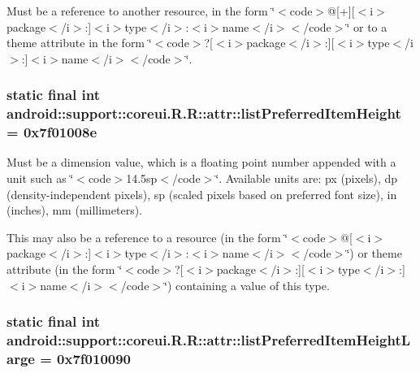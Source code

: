 Must be a reference to another resource, in the form \char`\"{}$<$code$>$@\mbox{[}+\mbox{]}\mbox{[}$<$i$>$package$<$/i$>$:\mbox{]}$<$i$>$type$<$/i$>$:$<$i$>$name$<$/i$>$$<$/code$>$\char`\"{} or to a theme attribute in the form \char`\"{}$<$code$>$?\mbox{[}$<$i$>$package$<$/i$>$:\mbox{]}\mbox{[}$<$i$>$type$<$/i$>$:\mbox{]}$<$i$>$name$<$/i$>$$<$/code$>$\char`\"{}. \hypertarget{classandroid_1_1support_1_1coreui_1_1_r_1_1attr_0d738afb53c0414840da274828da88df}{
\subsubsection[{listPreferredItemHeight}]{\setlength{\rightskip}{0pt plus 5cm}static final int android::support::coreui.R.R::attr::listPreferredItemHeight = 0x7f01008e}}
\label{classandroid_1_1support_1_1coreui_1_1_r_1_1attr_0d738afb53c0414840da274828da88df}


Must be a dimension value, which is a floating point number appended with a unit such as \char`\"{}$<$code$>$14.5sp$<$/code$>$\char`\"{}. Available units are: px (pixels), dp (density-independent pixels), sp (scaled pixels based on preferred font size), in (inches), mm (millimeters). 

This may also be a reference to a resource (in the form \char`\"{}$<$code$>$@\mbox{[}$<$i$>$package$<$/i$>$:\mbox{]}$<$i$>$type$<$/i$>$:$<$i$>$name$<$/i$>$$<$/code$>$\char`\"{}) or theme attribute (in the form \char`\"{}$<$code$>$?\mbox{[}$<$i$>$package$<$/i$>$:\mbox{]}\mbox{[}$<$i$>$type$<$/i$>$:\mbox{]}$<$i$>$name$<$/i$>$$<$/code$>$\char`\"{}) containing a value of this type. \hypertarget{classandroid_1_1support_1_1coreui_1_1_r_1_1attr_9ce7609a8d3883c587b07ac5ddbe023a}{
\subsubsection[{listPreferredItemHeightLarge}]{\setlength{\rightskip}{0pt plus 5cm}static final int android::support::coreui.R.R::attr::listPreferredItemHeightLarge = 0x7f010090}}
\label{classandroid_1_1support_1_1coreui_1_1_r_1_1attr_9ce7609a8d3883c587b07ac5ddbe023a}



